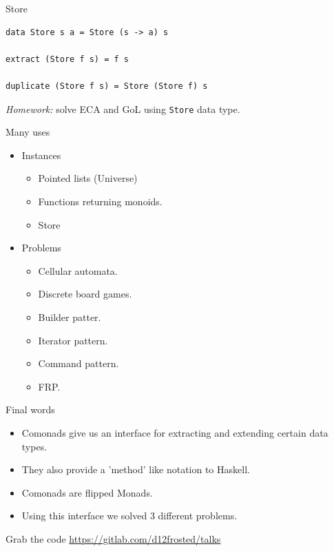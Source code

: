 \documentclass[presentation,aspectratio=169,smaller]{beamer}
\begin{document}
\begin{frame}[label={sec:org6b2b44d},fragile]{Store}
 \begin{verbatim}
data Store s a = Store (s -> a) s

extract (Store f s) = f s

duplicate (Store f s) = Store (Store f) s
\end{verbatim}

\pause

\emph{Homework:} solve ECA and GoL using \texttt{Store} data type.
\end{frame}

\begin{frame}[label={sec:orge4aade8}]{Many uses}
\begin{itemize}
\item <1-> Instances
\begin{itemize}
\item Pointed lists (Universe)
\item Functions returning monoids.
\item Store
\end{itemize}
\item <2-> Problems
\begin{itemize}
\item Cellular automata.
\item Discrete board games.
\item Builder patter.
\item Iterator pattern.
\item Command pattern.
\item FRP.
\end{itemize}
\end{itemize}
\end{frame}

\begin{frame}[label={sec:orgd43e357}]{Final words}
\begin{itemize}
\item <1-> Comonads give us an interface for extracting and extending certain data
types.
\item <2-> They also provide a 'method' like notation to Haskell.
\item <3-> Comonads are flipped Monads.
\item <4-> Using this interface we solved 3 different problems.
\end{itemize}
\end{frame}

\begin{frame}[label={sec:org7cc78a2}]{Grab the code}
\url{https://gitlab.com/d12frosted/talks}
\end{frame}
\end{document}
